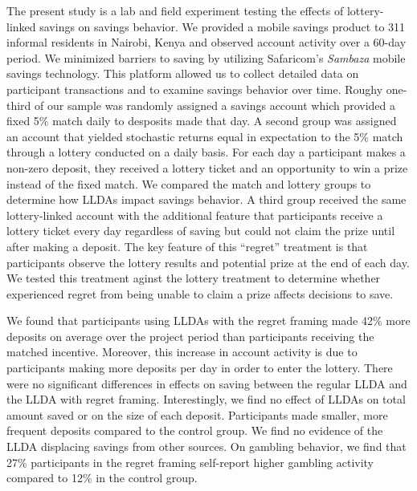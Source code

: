 \documentclass[12pt]{article}
\begin{document}

	The present study is a lab and field experiment testing the effects of lottery-linked savings on savings behavior. We provided a mobile savings product to 311 informal residents in Nairobi, Kenya and observed account activity over a 60-day period. We minimized barriers to saving by utilizing Safaricom's \textit{Sambaza} mobile savings technology. This platform allowed us to collect detailed data on participant transactions and to examine savings behavior over time. Roughy one-third of our sample was randomly assigned a savings account which provided a fixed 5\% match daily to desposits made that day. A second group was assigned an account that yielded stochastic returns equal in expectation to the 5\% match through a lottery conducted on a daily basis. For each day a participant makes a non-zero deposit, they received a lottery ticket and an opportunity to win a prize instead of the fixed match. We compared the match and lottery groups to determine how LLDAs impact savings behavior. A third group received the same lottery-linked account with the additional feature that participants receive a lottery ticket every day regardless of saving but could not claim the prize until after making a deposit. The key feature of this ``regret'' treatment is that participants observe the lottery results and potential prize at the end of each day. We tested this treatment aginst the lottery treatment to determine whether experienced regret from being unable to claim a prize affects decisions to save.


	We found that participants using LLDAs with the regret framing made 42\% more deposits on average over the project period than participants receiving the matched incentive. Moreover, this increase in account activity is due to participants making more deposits per day in order to enter the lottery. There were no significant differences in effects on saving between the regular LLDA and the LLDA with regret framing. Interestingly, we find no effect of LLDAs on total amount saved or on the size of each deposit. Participants made smaller, more frequent deposits compared to the control group. We find no evidence of the LLDA displacing savings from other sources. On gambling behavior, we find that 27\% participants in the regret framing self-report higher gambling activity compared to 12\% in the control group.
\end{document}
